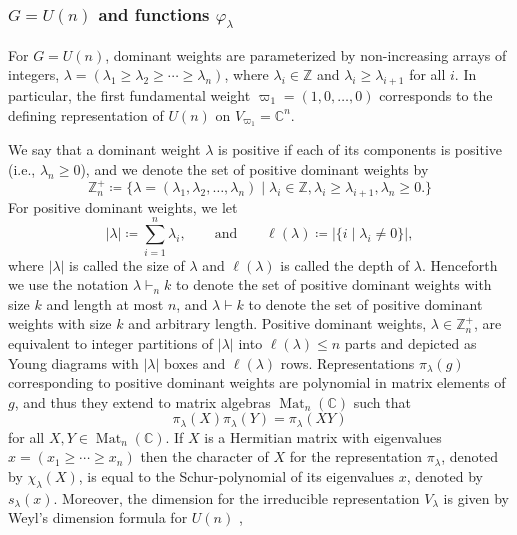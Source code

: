 \documentclass[notitlepage, 11pt, letterpaper]{amsart}
\theoremstyle{plain}
\theoremstyle{definition}
\DeclareMathOperator{\Mat}{Mat}
\newcommand{\card}[1]{\left|#1\right|}
\newcommand{\undomweightsp}[1]{\mathbb Z^{+}_{#1}}
\newcommand{\vp}{\varphi} %
\newcommand{\ex}{x}
\newcommand{\yx}{\lambda}
\newcommand{\syx}{|\yx|}
\begin{document}
\subsubsection{\texorpdfstring{$G=U(n)$}{G=U(n)} and  functions \texorpdfstring{$\vp_\yx$}{philambda}}

For $G=U(n)$, dominant weights are parameterized by non-increasing arrays of integers, $\yx=(\yx_1 \geq \yx_2 \geq \cdots \geq \yx_n)$, where $\yx_i \in \mathbb Z$ and $\yx_i \geq \yx_{i+1}$ for all $i$.
In particular, the first fundamental weight $\varpi_1=(1, 0, \ldots, 0)$ corresponds to the defining representation of $U(n)$ on $V_{\varpi_1} = \mathbb{C}^n$.

We say that a dominant weight $\yx$ is positive if each of its components is positive (i.e., $\yx_n \geq 0$), and we denote the set of positive dominant weights by
\begin{equation}
    \undomweightsp{n} \coloneqq \{ \yx=(\yx_1, \yx_2, \ldots, \yx_n) \mid \yx_i \in \mathbb Z, \yx_i \geq \yx_{i+1}, \yx_n \geq 0. \}
\end{equation}
For positive dominant weights, we let
\begin{equation}
    \syx \coloneqq \sum_{i=1}^n \yx_i,
    \qquad
    \text{and}
    \qquad
    \ell(\yx) \coloneqq \card{\{i \mid \yx_i \neq 0\}},
\end{equation}
where $\syx$ is called the size of $\yx$ and $\ell(\yx)$ is called the depth of $\yx$.
Henceforth we use the notation $\yx \vdash_{n} k$ to denote the set of positive dominant weights with size $k$ and length at most $n$, and $\yx \vdash k$ to denote the set of positive dominant weights with size $k$ and arbitrary length.
Positive dominant weights, $\yx \in \undomweightsp{n}$, are equivalent to integer partitions of $\syx$ into $\ell(\yx) \leq n$ parts and depicted as Young diagrams with $\syx$ boxes and $\ell(\yx)$ rows.
Representations $\pi_\yx(g)$ corresponding to positive dominant weights are polynomial in matrix elements of $g$, and thus they extend to matrix algebras $\Mat_n(\mathbb{C})$ such that
\begin{equation}
    \pi_\yx(X) \pi_\yx(Y) = \pi_\yx(XY)
\end{equation}
for all $X,Y \in \Mat_n(\mathbb{C})$.
If $X$ is a Hermitian matrix with eigenvalues $\ex = (\ex_1 \geq \cdots \geq \ex_n)$ then the character of $X$ for the representation $\pi_{\yx}$, denoted by $\chi_{\yx}(X)$, is equal to the Schur-polynomial of its eigenvalues $\ex$, denoted by $s_{\yx}(\ex)$.
Moreover, the dimension for the irreducible representation $V_{\yx}$ is given by Weyl's dimension formula for $U(n)$ \cite{hall2008representations,itzykson1966unitary},
\end{document}

